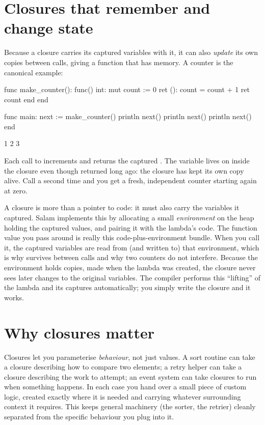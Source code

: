 \section{Closures that remember and change state}

Because a closure carries its captured variables with it, it can also \emph{update}
its own copies between calls, giving a function that has memory. A counter is the
canonical example:

\begin{salamen}
func make_counter(): func() int:
    mut count := 0
    ret ():
        count = count + 1
        ret count
    end
end

func main:
    next := make_counter()
    println next()
    println next()
    println next()
end
\end{salamen}

\begin{progout}
1
2
3
\end{progout}

Each call to  increments and returns the captured . The
variable  lives on inside the closure even though 
returned long ago: the closure has kept its own copy alive. Call  a
second time and you get a fresh, independent counter starting again at zero.

\begin{deep}
A closure is more than a pointer to code: it must also carry the variables it
captured. Salam implements this by allocating a small \emph{environment} on the
heap holding the captured values, and pairing it with the lambda's code. The
function value you pass around is really this code-plus-environment bundle. When
you call it, the captured variables are read from (and written to) that
environment, which is why  survives between calls and why two counters
do not interfere. Because the environment holds copies, made when the lambda was
created, the closure never sees later changes to the original variables. The compiler performs this ``lifting'' of the lambda and its
captures automatically; you simply write the closure and it works.
\end{deep}

\section{Why closures matter}

Closures let you parameterise \emph{behaviour}, not just values. A sort routine
can take a closure describing how to compare two elements; a retry helper can take
a closure describing the work to attempt; an event system can take closures to run
when something happens. In each case you hand over a small piece of custom logic,
created exactly where it is needed and carrying whatever surrounding context it
requires. This keeps general machinery (the sorter, the retrier) cleanly separated
from the specific behaviour you plug into it.

